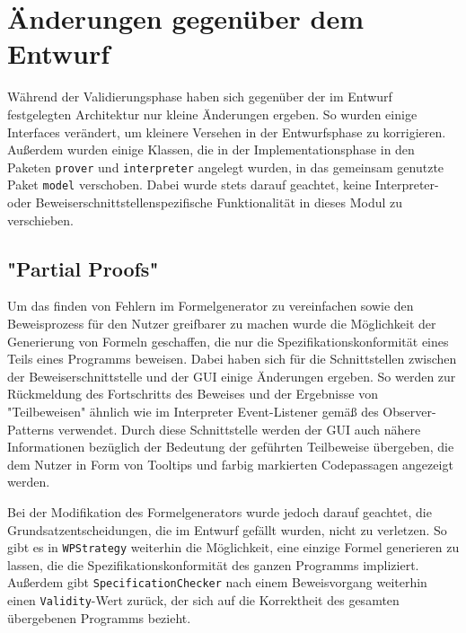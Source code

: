 \section{Änderungen gegenüber dem Entwurf}

Während der Validierungsphase haben sich gegenüber der im Entwurf festgelegten Architektur nur kleine Änderungen ergeben. So wurden einige Interfaces verändert, um kleinere Versehen in der Entwurfsphase zu korrigieren. Außerdem wurden einige Klassen, die in der Implementationsphase in den Paketen \texttt{prover} und \texttt{interpreter} angelegt wurden, in das gemeinsam genutzte Paket \texttt{model} verschoben. Dabei wurde stets darauf geachtet, keine Interpreter- oder Beweiserschnittstellenspezifische Funktionalität in dieses Modul zu verschieben.

\subsection{"Partial Proofs"}

Um das finden von Fehlern im Formelgenerator zu vereinfachen sowie den Beweisprozess für den Nutzer greifbarer zu machen wurde die Möglichkeit der Generierung von Formeln geschaffen, die nur die Spezifikationskonformität eines Teils eines Programms beweisen. Dabei haben sich für die Schnittstellen zwischen der Beweiserschnittstelle und der GUI einige Änderungen ergeben. So werden zur Rückmeldung des Fortschritts des Beweises und der Ergebnisse von "Teilbeweisen" ähnlich wie im Interpreter Event-Listener gemäß des Observer-Patterns verwendet. Durch diese Schnittstelle werden der GUI auch nähere Informationen bezüglich der Bedeutung der geführten Teilbeweise übergeben, die dem Nutzer in Form von Tooltips und farbig markierten Codepassagen angezeigt werden.

Bei der Modifikation des Formelgenerators wurde jedoch darauf geachtet, die Grundsatzentscheidungen, die im Entwurf gefällt wurden, nicht zu verletzen. So gibt es in \texttt{WPStrategy} weiterhin die Möglichkeit, eine einzige Formel generieren zu lassen, die die Spezifikationskonformität des ganzen Programms impliziert. Außerdem gibt \texttt{SpecificationChecker} nach einem Beweisvorgang weiterhin einen \texttt{Validity}-Wert zurück, der sich auf die Korrektheit des gesamten übergebenen Programms bezieht.
